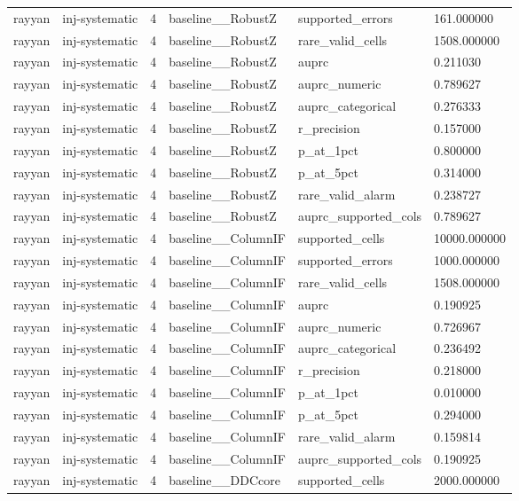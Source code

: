 \begin{tabular}{llllll}
rayyan & inj-systematic & 4 & baseline\_\_RobustZ & supported\_errors & 161.000000 \\
rayyan & inj-systematic & 4 & baseline\_\_RobustZ & rare\_valid\_cells & 1508.000000 \\
rayyan & inj-systematic & 4 & baseline\_\_RobustZ & auprc & 0.211030 \\
rayyan & inj-systematic & 4 & baseline\_\_RobustZ & auprc\_numeric & 0.789627 \\
rayyan & inj-systematic & 4 & baseline\_\_RobustZ & auprc\_categorical & 0.276333 \\
rayyan & inj-systematic & 4 & baseline\_\_RobustZ & r\_precision & 0.157000 \\
rayyan & inj-systematic & 4 & baseline\_\_RobustZ & p\_at\_1pct & 0.800000 \\
rayyan & inj-systematic & 4 & baseline\_\_RobustZ & p\_at\_5pct & 0.314000 \\
rayyan & inj-systematic & 4 & baseline\_\_RobustZ & rare\_valid\_alarm & 0.238727 \\
rayyan & inj-systematic & 4 & baseline\_\_RobustZ & auprc\_supported\_cols & 0.789627 \\
rayyan & inj-systematic & 4 & baseline\_\_ColumnIF & supported\_cells & 10000.000000 \\
rayyan & inj-systematic & 4 & baseline\_\_ColumnIF & supported\_errors & 1000.000000 \\
rayyan & inj-systematic & 4 & baseline\_\_ColumnIF & rare\_valid\_cells & 1508.000000 \\
rayyan & inj-systematic & 4 & baseline\_\_ColumnIF & auprc & 0.190925 \\
rayyan & inj-systematic & 4 & baseline\_\_ColumnIF & auprc\_numeric & 0.726967 \\
rayyan & inj-systematic & 4 & baseline\_\_ColumnIF & auprc\_categorical & 0.236492 \\
rayyan & inj-systematic & 4 & baseline\_\_ColumnIF & r\_precision & 0.218000 \\
rayyan & inj-systematic & 4 & baseline\_\_ColumnIF & p\_at\_1pct & 0.010000 \\
rayyan & inj-systematic & 4 & baseline\_\_ColumnIF & p\_at\_5pct & 0.294000 \\
rayyan & inj-systematic & 4 & baseline\_\_ColumnIF & rare\_valid\_alarm & 0.159814 \\
rayyan & inj-systematic & 4 & baseline\_\_ColumnIF & auprc\_supported\_cols & 0.190925 \\
rayyan & inj-systematic & 4 & baseline\_\_DDCcore & supported\_cells & 2000.000000 \\

\end{tabular}
